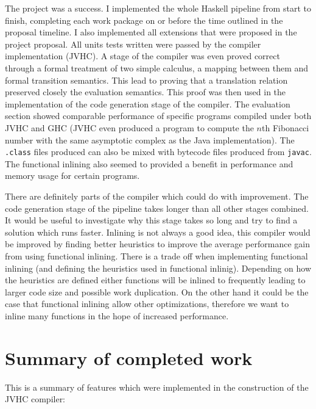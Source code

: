 \documentclass[float=false, crop=false]{standalone}
\begin{document}
The project was a success. I implemented the whole Haskell
pipeline from start to finish, completing each work package on or
before the time outlined in the proposal timeline. I also implemented
all extensions that were proposed in the project proposal. 
All units tests written were passed by the compiler implementation (JVHC). 
A stage of the compiler was even proved correct through
a formal treatment of two simple calculus, a mapping between them
and formal transition semantics. This lead to proving that a translation
relation preserved closely the evaluation semantics. This proof was then 
used in the implementation of the code generation stage of the compiler.
The evaluation section showed comparable performance of specific programs
compiled under both JVHC and GHC (JVHC even produced a program to compute
the $n$th Fibonacci number with the same asymptotic complex as the Java
implementation). The \verb|.class| files produced can also be mixed with 
bytecode files produced from \verb|javac|. The functional inlining also
seemed to provided a benefit in performance and memory usage for certain
programs. 

There are definitely parts of the compiler which could do with improvement.
The code generation stage of the pipeline takes longer than all other stages 
combined. It would be useful to investigate why this stage takes so long 
and try to find a solution which runs faster.
Inlining is not always a good idea, this compiler would be improved 
by finding better heuristics to improve the average performance
gain from using functional inlining.
There is a trade off when implementing functional inlining (and defining
the heuristics used in functional inlinig).
Depending on how the heuristics are defined either functions will
be inlined to frequently leading to larger code size and possible
work duplication. On the other hand it could be the case that 
functional inlining allow other optimizations, therefore we want to 
inline many functions in the hope of increased performance.

\section{Summary of completed work}

This is a summary of features which were implemented in the construction
of the JVHC compiler:
\end{document}
